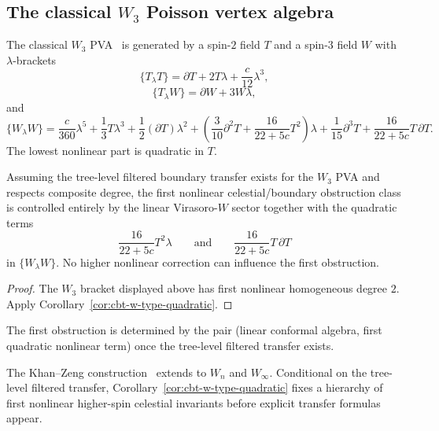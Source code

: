 \subsection{The classical \texorpdfstring{$W_3$}{W3} Poisson vertex algebra}
\label{sec:cbt-w3-example}

The classical $W_3$ PVA~\cite{KZ25} is generated by a spin-$2$ field $T$ and a spin-$3$ field $W$ with $\lambda$-brackets
\[
\{T_\lambda T\}=\partial T+2T\lambda+\frac{c}{12}\lambda^3,
\]
\[
\{T_\lambda W\}=\partial W+3W\lambda,
\]
and
\[
\{W_\lambda W\}
=
\frac{c}{360}\lambda^5
+\frac13 T\lambda^3
+\frac12(\partial T)\lambda^2
+\left(\frac{3}{10}\partial^2T+\frac{16}{22+5c}T^2\right)\lambda
+\frac1{15}\partial^3T
+\frac{16}{22+5c}T\,\partial T.
\]
The lowest nonlinear part is quadratic in $T$.

\begin{corollary}
\label{cor:cbt-w3-obstruction}
\ClaimStatusConditional
Assuming the tree-level filtered boundary transfer exists for the $W_3$ PVA and respects composite degree, the first nonlinear celestial/boundary obstruction class is controlled entirely by the linear Virasoro-$W$ sector together with the quadratic terms
\[
\frac{16}{22+5c}T^2\lambda
\qquad\text{and}\qquad
\frac{16}{22+5c}T\,\partial T
\]
in $\{W_\lambda W\}$. No higher nonlinear correction can influence the first obstruction.
\end{corollary}

\begin{proof}
The $W_3$ bracket displayed above has first nonlinear homogeneous degree $2$. Apply Corollary~\ref{cor:cbt-w-type-quadratic}.
\end{proof}

\begin{remark}
\label{rem:cbt-universal-first-correction}
The first obstruction is determined by the pair (linear conformal algebra, first quadratic nonlinear term) once the tree-level filtered transfer exists.
\end{remark}

\begin{remark}
\label{rem:cbt-beyond-w3}
The Khan--Zeng construction~\cite{KZ25} extends to $W_n$ and $W_\infty$. Conditional on the tree-level filtered transfer, Corollary~\ref{cor:cbt-w-type-quadratic} fixes a hierarchy of first nonlinear higher-spin celestial invariants before explicit transfer formulas appear.
\end{remark}

